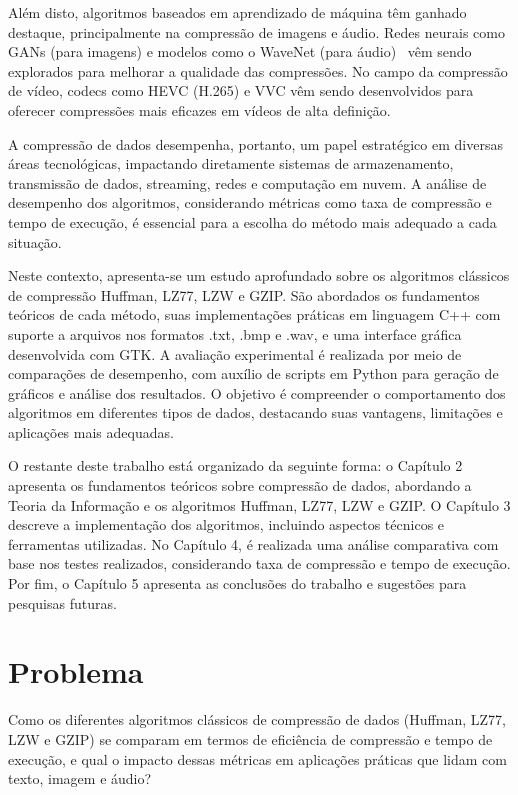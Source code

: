   Além disto, algoritmos baseados em aprendizado de máquina têm ganhado destaque, principalmente na compressão de
  imagens e áudio. Redes neurais como GANs (para imagens) e modelos como o WaveNet (para áudio)~\cite{wavenet} vêm sendo
  explorados para melhorar a qualidade das compressões. No campo da compressão de vídeo, codecs como HEVC (H.265) e VVC
  vêm sendo desenvolvidos para oferecer compressões mais eficazes em vídeos de alta definição.

  A compressão de dados desempenha, portanto, um papel estratégico em diversas áreas tecnológicas, impactando diretamente sistemas de armazenamento, transmissão de dados, streaming, redes e computação em nuvem. A análise de desempenho dos algoritmos, considerando métricas como taxa de compressão e tempo de execução, é essencial para a escolha do método mais adequado a cada situação.

Neste contexto, apresenta-se um estudo aprofundado sobre os algoritmos clássicos de compressão Huffman, LZ77, LZW e GZIP. São abordados os fundamentos teóricos de cada método, suas implementações práticas em linguagem C++ com suporte a arquivos nos formatos .txt, .bmp e .wav, e uma interface gráfica desenvolvida com GTK. A avaliação experimental é realizada por meio de comparações de desempenho, com auxílio de scripts em Python para geração de gráficos e análise dos resultados. O objetivo é compreender o comportamento dos algoritmos em diferentes tipos de dados, destacando suas vantagens, limitações e aplicações mais adequadas.

O restante deste trabalho está organizado da seguinte forma: o Capítulo 2 apresenta os fundamentos teóricos sobre compressão de dados, abordando a Teoria da Informação e os algoritmos Huffman, LZ77, LZW e GZIP. O Capítulo 3 descreve a implementação dos algoritmos, incluindo aspectos técnicos e ferramentas utilizadas. No Capítulo 4, é realizada uma análise comparativa com base nos testes realizados, considerando taxa de compressão e tempo de execução. Por fim, o Capítulo 5 apresenta as conclusões do trabalho e sugestões para pesquisas futuras.

\section{Problema}
Como os diferentes algoritmos clássicos de compressão de dados (Huffman, LZ77, LZW e GZIP) 
se comparam em termos de eficiência de compressão e tempo de execução, e qual o impacto dessas métricas em aplicações práticas que
lidam com texto, imagem e áudio?

